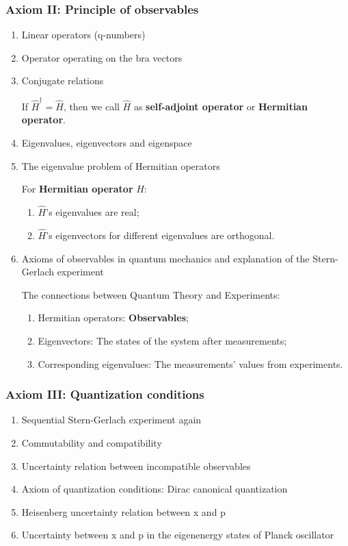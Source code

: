 \documentclass[12pt]{article}
\numberwithin{equation}{section}
\begin{document}
\subsubsection{Axiom II: Principle of observables}
\begin{enumerate}
\item Linear operators (q-numbers)
\item Operator operating on the bra vectors
\item Conjugate relations

If $\hat{H}^\dag=\hat{H}$, then we call $\hat{H}$ as \textbf{self-adjoint operator} or \textbf{Hermitian operator}.
\item Eigenvalues, eigenvectors and eigenspace
\item The eigenvalue problem of Hermitian operators

For \textbf{Hermitian operator} $\hat{H}$:
\begin{enumerate}
	\item $\hat{H}$'s eigenvalues are real;
	\item $\hat{H}$'s eigenvectors for different eigenvalues are orthogonal.
\end{enumerate}
\item Axioms of observables in quantum mechanics and explanation of the Stern-Gerlach experiment

The connections between Quantum Theory and Experiments:
\begin{enumerate}
	\item Hermitian operators: \textbf{Observables};  
	\item Eigenvectors: The states of the system after measurements;
	\item Corresponding eigenvalues: The measurements' values from experiments.
\end{enumerate}
\end{enumerate}
\subsubsection{Axiom III: Quantization conditions}
\begin{enumerate}
\item Sequential Stern-Gerlach experiment again
\item Commutability and compatibility
\item Uncertainty relation between incompatible observables
\item Axiom of quantization conditions: Dirac canonical quantization
\item Heisenberg uncertainty relation between x and p
\item Uncertainty between x and p in the eigenenergy states of Planck oscillator
\end{enumerate}
\end{document}
